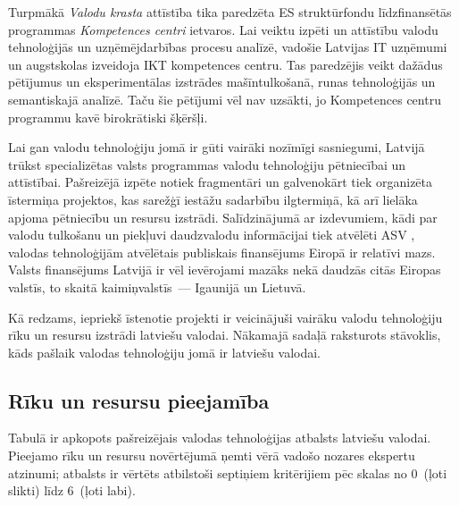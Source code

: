 \begin{multicols}{2}
Turpmākā \textit{Valodu krasta} attīstība tika paredzēta ES struktūrfondu līdzfinansētās programmas \textit{Kompetences centri} ietvaros.
Lai veiktu izpēti un attīstību valodu tehnoloģijās un uzņēmējdarbības procesu analīzē, vadošie Latvijas IT uzņēmumi un augstskolas izveidoja IKT kompetences centru.
Tas paredzējis veikt dažādus pētījumus un eksperimentālas izstrādes mašīntulkošanā, runas tehnoloģijās un semantiskajā analīzē.
Taču šie pētījumi vēl nav uzsākti, jo Kompetences centru programmu kavē birokrātiski šķēršļi.

Lai gan valodu tehnoloģiju jomā ir gūti vairāki nozīmīgi sasniegumi, Latvijā trūkst specializētas valsts programmas valodu tehnoloģiju pētniecībai un attīstībai.
Pašreizējā izpēte notiek fragmentāri un galvenokārt tiek organizēta īstermiņa projektos, kas sarežģī iestāžu sadarbību ilgtermiņā, kā arī lielāka apjoma pētniecību un resursu izstrādi.
Salīdzinājumā ar izdevumiem, kādi par valodu tulkošanu un piekļuvi daudzvalodu informācijai tiek atvēlēti ASV \cite{Meta46}, valodas tehnoloģijām atvēlētais publiskais finansējums Eiropā ir relatīvi mazs.
Valsts finansējums Latvijā ir vēl ievērojami mazāks nekā daudzās citās Eiropas valstīs, to skaitā kaimiņvalstīs~--- Igaunijā un Lietuvā.

Kā redzams, iepriekš īstenotie projekti ir veicinājuši vairāku valodu tehnoloģiju rīku un resursu izstrādi latviešu valodai.
Nākamajā sadaļā raksturots stāvoklis, kāds pašlaik valodas tehnoloģiju jomā ir latviešu valodai.

\subsection{Rīku un resursu pieejamība}

Tabulā ir apkopots pašreizējais valodas tehnoloģijas atbalsts latviešu valodai.
Pieejamo rīku un resursu novērtējumā ņemti vērā vadošo nozares ekspertu atzinumi; atbalsts ir vērtēts atbilstoši septiņiem kritērijiem pēc skalas no 0~(ļoti slikti) līdz 6~(ļoti labi). 


\end{multicols}
